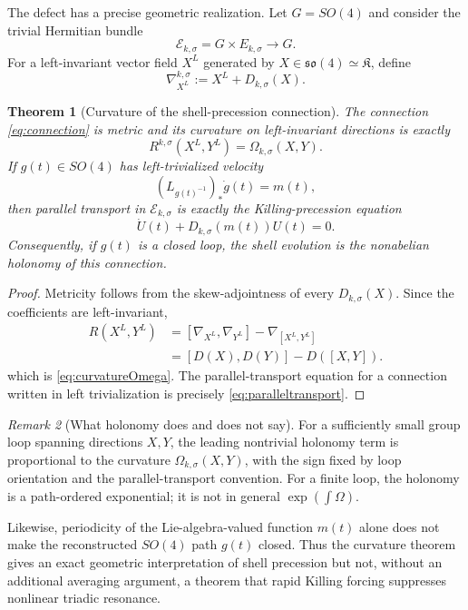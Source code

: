 \documentclass[
 aps,
 prd,
 reprint,
 amsmath,
 amssymb,
 nofootinbib,
 superscriptaddress
]{revtex4-2}
\newtheorem{theorem}{Theorem}[section]
\theoremstyle{definition}
\theoremstyle{remark}
\newtheorem{remark}[theorem]{Remark}
\newcommand{\cK}{\mathfrak K}
\begin{document}
The defect has a precise geometric realization.  Let
$G=SO(4)$ and consider the trivial Hermitian bundle
\[
 \mathscr E_{k,\sigma}=G\times E_{k,\sigma}\longrightarrow G.
\]
For a left-invariant vector field $X^L$ generated by
$X\in\mathfrak{so}(4)\simeq\cK$, define
\begin{equation}
 \nabla^{k,\sigma}_{X^L}
 :=
 X^L + D_{k,\sigma}(X).
 \label{eq:connection}
\end{equation}

\begin{theorem}[Curvature of the shell-precession connection]
\label{thm:connectioncurvature}
The connection \eqref{eq:connection} is metric and its curvature on
left-invariant directions is exactly
\begin{equation}
 \boxed{
 R^{k,\sigma}(X^L,Y^L)
 =
 \Omega_{k,\sigma}(X,Y).
 }
 \label{eq:curvatureOmega}
\end{equation}
If $g(t)\in SO(4)$ has left-trivialized velocity
\[
 (L_{g(t)^{-1}})_*\dot g(t)=m(t),
\]
then parallel transport in $\mathscr E_{k,\sigma}$ is exactly the
Killing-precession equation
\begin{equation}
 \dot U(t)+D_{k,\sigma}(m(t))U(t)=0.
 \label{eq:paralleltransport}
\end{equation}
Consequently, if $g(t)$ is a closed loop, the shell evolution is the
nonabelian holonomy of this connection.
\end{theorem}

\begin{proof}
Metricity follows from the skew-adjointness of every
$D_{k,\sigma}(X)$.  Since the coefficients are left-invariant,
\[
\begin{aligned}
 R(X^L,Y^L)
 &=
 [\nabla_{X^L},\nabla_{Y^L}]
 -
 \nabla_{[X^L,Y^L]}\\
 &=
 [D(X),D(Y)]-D([X,Y]).
\end{aligned}
\]
which is \eqref{eq:curvatureOmega}.  The parallel-transport equation for a
connection written in left trivialization is precisely
\eqref{eq:paralleltransport}.
\end{proof}

\begin{remark}[What holonomy does and does not say]
For a sufficiently small group loop spanning directions $X,Y$, the leading
nontrivial holonomy term is proportional to the curvature
$\Omega_{k,\sigma}(X,Y)$, with the sign fixed by loop orientation and the
parallel-transport convention.  For a finite loop, the holonomy is a
path-ordered exponential; it is not in general
$\exp(\int\Omega)$.

Likewise, periodicity of the Lie-algebra-valued function $m(t)$ alone does
not make the reconstructed $SO(4)$ path $g(t)$ closed.  Thus the curvature
theorem gives an exact geometric interpretation of shell precession but not,
without an additional averaging argument, a theorem that rapid Killing
forcing suppresses nonlinear triadic resonance.
\end{remark}
\end{document}
